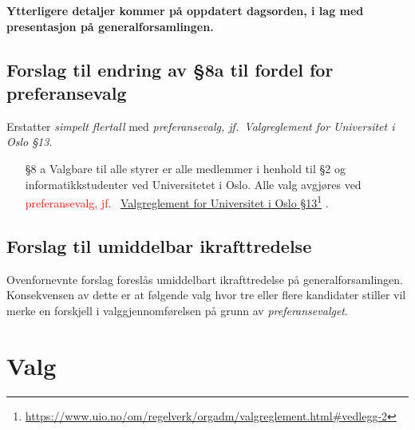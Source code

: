 \documentclass[10pt,norsk,a4paper]{article}
\newcommand\fhref[2]{%
	\href{#1}{#2}\footnote{\url{#1}}%
}
\begin{document}
\textbf{Ytterligere detaljer kommer på oppdatert dagsorden, i lag med presentasjon på generalforsamlingen.}

\subsection{Forslag til endring av §8a til fordel for preferansevalg}

Erstatter \textit{simpelt flertall} med \textit{preferansevalg, jf.~Valgreglement for Universitet i Oslo §13}.

\begin{enumerate}
	\item[§8 a] Valgbare til alle styrer er alle medlemmer i henhold til §2 og informatikkstudenter ved Universitetet i Oslo. Alle valg avgjøres ved \textcolor{red}{preferansevalg, jf.~\fhref{https://www.uio.no/om/regelverk/orgadm/valgreglement.html\#vedlegg-2}{Valgreglement for Universitet i Oslo §13}}.
\end{enumerate}

\subsection{Forslag til umiddelbar ikrafttredelse}

Ovenfornevnte forslag foreslås umiddelbart ikrafttredelse på generalforsamlingen.
Konsekvensen av dette er at følgende valg hvor tre eller flere kandidater stiller vil merke en forskjell i valggjennomførelsen på grunn av \textit{preferansevalget}.



\section{Valg}
\end{document}

